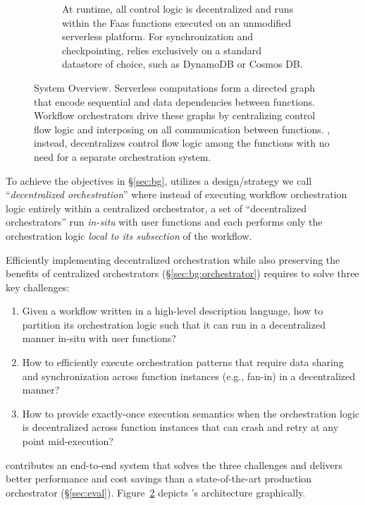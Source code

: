 \begin{figure}[t]
\begin{subfigure}[b]{\columnwidth}
		\caption{At runtime, all \name{} control logic is decentralized and runs within the Faas 
			functions executed on an unmodified serverless platform. For synchronization and checkpointing, \name{} relies exclusively on a
			standard datastore of choice, such as DynamoDB or Cosmos DB.}
		\label{fig:arch:unum-runtime}
	\end{subfigure}
	\caption{\name{} System Overview. Serverless computations form a directed
		graph that encode sequential and data dependencies between functions. Workflow
		orchestrators drive these graphs by centralizing control flow logic and
		interposing on all communication between functions. \name{},
		instead, decentralizes control flow logic among the functions with
		no need for a separate orchestration system.}
	\label{fig:arch}
\end{figure}

To achieve the objectives in \S\ref{sec:bg}, \name{} utilizes a
design/strategy we call ``\emph{decentralized orchestration}'' where instead
of executing workflow orchestration logic entirely within a centralized
orchestrator, a set of ``decentralized orchestrators'' run \emph{in-situ} with
user functions and each performs only the orchestration logic \emph{local to
its subsection} of the workflow.

Efficiently implementing decentralized orchestration while also preserving the
benefits of centralized orchestrators (\S\ref{sec:bg:orchestrator}) requires
\name{} to solve three key challenges:

\begin{enumerate}

	\item Given a workflow written in a high-level description language, how
	to partition its orchestration logic such that it can run in a
	decentralized manner in-situ with user functions?

	\item How to efficiently execute orchestration patterns that require data
	sharing and synchronization across function instances (e.g., fan-in) in a
	decentralized manner?

	\item How to provide exactly-once execution semantics when the
	orchestration logic is decentralized across function instances that can
	crash and retry at any point mid-execution?

\end{enumerate}

\name{} contributes an end-to-end system that solves the three challenges and
delivers better performance and cost savings than a state-of-the-art
production orchestrator (\S\ref{sec:eval}). Figure~\ref{fig:arch} depicts
\name{}'s architecture graphically.

